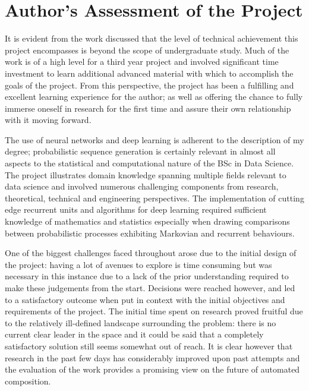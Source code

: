 \documentclass[12pt,]{article}
\begin{document}
\hypertarget{authors-assessment-of-the-project}{%
\section{Author's Assessment of the
Project}\label{authors-assessment-of-the-project}}

It is evident from the work discussed that the level of technical
achievement this project encompasses is beyond the scope of
undergraduate study. Much of the work is of a high level for a third
year project and involved significant time investment to learn
additional advanced material with which to accomplish the goals of the
project. From this perspective, the project has been a fulfilling and
excellent learning experience for the author; as well as offering the
chance to fully immerse oneself in research for the first time and
assure their own relationship with it moving forward.

The use of neural networks and deep learning is adherent to the
description of my degree; probabilistic sequence generation is certainly
relevant in almost all aspects to the statistical and computational
nature of the BSc in Data Science. The project illustrates domain
knowledge spanning multiple fields relevant to data science and involved
numerous challenging components from research, theoretical, technical
and engineering perspectives. The implementation of cutting edge
recurrent units and algorithms for deep learning required sufficient
knowledge of mathematics and statistics especially when drawing
comparisons between probabilistic processes exhibiting Markovian and
recurrent behaviours.

One of the biggest challenges faced throughout arose due to the initial
design of the project: having a lot of avenues to explore is time
consuming but was necessary in this instance due to a lack of the prior
understanding required to make these judgements from the start.
Decisions were reached however, and led to a satisfactory outcome when
put in context with the initial objectives and requirements of the
project. The initial time spent on research proved fruitful due to the
relatively ill-defined landscape surrounding the problem: there is no
current clear leader in the space and it could be said that a completely
satisfactory solution still seems somewhat out of reach. It is clear
however that research in the past few days has considerably improved
upon past attempts and the evaluation of the work provides a promising
view on the future of automated composition.
\end{document}
